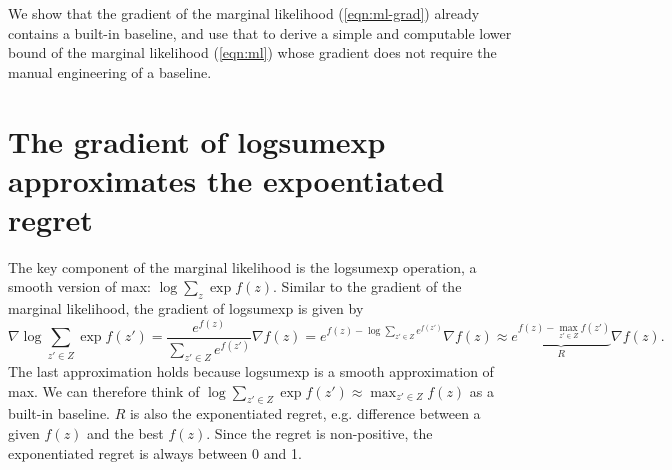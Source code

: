 \documentclass[12pt]{article}
\begin{document}
We show that the gradient of the marginal likelihood (\ref{eqn:ml-grad}) already contains
a built-in baseline, and use that to derive a simple and computable lower bound
of the marginal likelihood
(\ref{eqn:ml}) whose gradient does not require the manual engineering of a baseline.

\section{The gradient of logsumexp approximates the expoentiated regret}
The key component of the marginal likelihood is the logsumexp operation,
a smooth version of max: $\log \sum_z \exp f(z)$.
Similar to the gradient of the marginal likelihood,
the gradient of logsumexp is given by
$$
\nabla \log \sum_{z'\in Z} \exp f(z')
= \frac{e^{f(z)}}{\sum_{z' \in Z} e^{f(z')}} \nabla f(z)
= e^{f(z) - \log \sum_{z' \in Z} e^{f(z')}} \nabla f(z)
\approx \underbrace{e^{f(z) - \max_{z' \in Z} f(z')}}_{R} \nabla f(z).
$$
The last approximation holds because logsumexp is a smooth approximation of max.
We can therefore think of $\log \sum_{z'\in Z}\exp f(z')\approx \max_{z'\in Z} f(z)$
as a built-in baseline.
$R$ is also the exponentiated regret, e.g. difference between a given $f(z)$
and the best $f(z)$.
Since the regret is non-positive, the exponentiated regret is always between 0 and 1.
\end{document}
